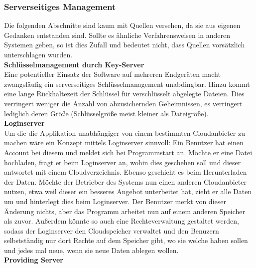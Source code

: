 \documentclass[12pt,a4paper,bibliography=totocnumbered,listof=totocnumbered]{scrartcl}
\begin{document}
\subsubsection{Serverseitiges Management}
Die folgenden Abschnitte sind kaum mit Quellen versehen, da sie aus eigenen Gedanken entstanden sind. Sollte es ähnliche Verfahrensweisen in anderen Systemen geben, so ist dies Zufall und bedeutet nicht, dass Quellen vorsätzlich unterschlagen wurden.\\
\textbf{Schlüsselmanagement durch Key-Server}\\
Eine potentieller Einsatz der Software auf mehreren Endgeräten macht zwangsläufig ein serverseitiges Schlüsselmanagement unabdingbar. Hinzu kommt eine lange Rückhaltezeit der Schlüssel für verschlüsselt abgelegte Dateien. Dies verringert weniger die Anzahl von abzusichernden Geheimnissen, es verringert lediglich deren Größe (Schlüsselgröße meist kleiner als Dateigröße). \cite{38}
\\\textbf{Loginserver}\\
Um die die Applikation unabhängiger von einem bestimmten Cloudanbieter zu machen wäre ein Konzept mittels Loginserver sinnvoll: Ein Benutzer hat einen Account bei diesem und meldet sich bei Programmstart an. Möchte er eine Datei hochladen, fragt er beim Loginserver an, wohin dies geschehen soll und dieser antwortet mit einem Cloudverzeichnis. Ebenso geschieht es beim Herunterladen der Daten. Möchte der Betrieber des Systems nun einen anderen Cloudanbieter nutzen, etwa weil dieser ein besseres Angebot unterbeitet hat, zieht er alle Daten um und hinterlegt dies beim Loginserver. Der Benutzer merkt von dieser Änderung nichts, aber das Programm arbeitet nun auf einem anderen Speicher als zuvor. Außerdem könnte so auch eine Rechteverwaltung gestaltet werden, sodass der Loginserver den Cloudspeicher verwaltet und den Benuzern selbstständig nur dort Rechte auf dem Speicher gibt, wo sie welche haben sollen und jedes mal neue, wenn sie neue Daten ablegen wollen.
\\\textbf{Providing Server}\label{provV}\\
\end{document}
